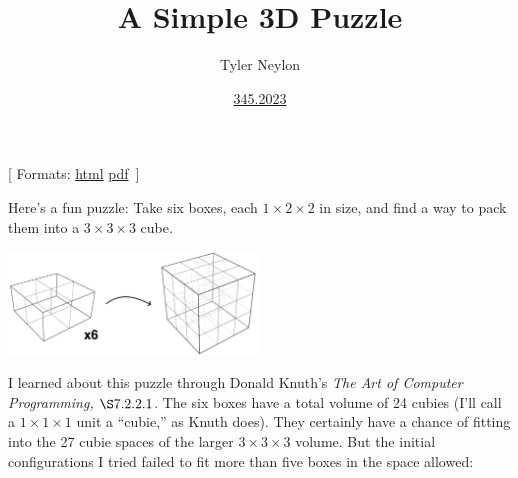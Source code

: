 \documentclass[
]{article}
\title{A Simple 3D Puzzle}
\author{Tyler Neylon}
\date{\href{https://tylerneylon.com/a/7date/}{345.2023}}
\newcommand{\class}[1]{}
\newcommand{\optquad}{\quad}
\newcommand{\smallscrneg}{}
\newcommand{\smallscr}[1]{}
\newcommand{\bigscr}[1]{#1}
\newcommand{\smallscrskip}[1]{}
\begin{document}
\maketitle

\newcommand{\R}{\mathbb{R}}
\newcommand{\N}{\mathbb{N}}
\newcommand{\eqnset}[1]{\left.\mbox{$#1$}\;\;\right\rbrace\class{postbrace}{ }}
\providecommand{\latexonlyrule}[3][]{}
\providecommand{\optquad}{\class{optquad}{}}
\providecommand{\smallscrneg}{\class{smallscrneg}{ }}
\providecommand{\bigscr}[1]{\class{bigscr}{#1}}
\providecommand{\smallscr}[1]{\class{smallscr}{#1}}
\providecommand{\smallscrskip}[1]{\class{smallscrskip}{\hskip #1}}

\newcommand{\mydots}{{\cdot}\kern -0.1pt{\cdot}\kern -0.1pt{\cdot}}

\newcommand{\?}{\stackrel{?}{=}}
\newcommand{\sign}{\textsf{sign}}
\newcommand{\order}{\textsf{order}}
\newcommand{\flips}{\textsf{flips}}
\newcommand{\samecycles}{\textsf{same$\\\_$cycles}}
\newcommand{\canon}{\textsf{canon}}
\newcommand{\cs}{\mathsf{cs}}
\newcommand{\dist}{\mathsf{dist}}
\renewcommand{\theenumi}{(\roman{enumi})}

{[} Formats:
\href{http://tylerneylon.com/a/lego_puzzle/lego_puzzle.html}{html}
\textbar{}
\href{http://tylerneylon.com/a/lego_puzzle/lego_puzzle.pdf}{pdf}
\(\,\){]}

Here's a fun puzzle: Take six boxes, each \(1\times 2\times 2\) in size,
and find a way to pack them into a \(3\times 3\times 3\) cube.

\begin{center}\includegraphics[width=0.5\textwidth]{img/img1.pdf}\end{center}

I learned about this puzzle through Donald Knuth's \emph{The Art of
Computer Programming,} \(\S 7.2.2.1\). The six boxes have a total volume
of 24 cubies (I'll call a \(1\times 1\times 1\) unit a ``cubie,'' as
Knuth does). They certainly have a chance of fitting into the 27 cubie
spaces of the larger \(3\times 3\times 3\) volume. But the initial
configurations I tried failed to fit more than five boxes in the space
allowed:
\end{document}
